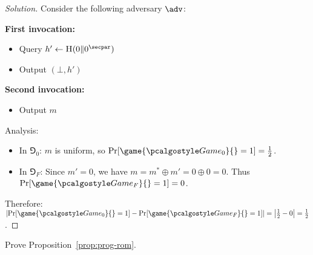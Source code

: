 \begin{proof}[Solution]
  Consider the following adversary $\adv$:
  
  \textbf{First invocation:}
  \begin{itemize}
    \item Query $h' \gets \pcoracle{H}(0 \| 0^\secpar)$
    \item Output $(\bot, h')$
  \end{itemize}
  
  \textbf{Second invocation:}
  \begin{itemize}
    \item Output $m$
  \end{itemize}
  
  Analysis:
  \begin{itemize}
    \item In $\Game_0$: $m$ is uniform, so $\Pr[\game{\Game_0}{} = 1] = \frac{1}{2}$.
    \item In $\Game_F$: Since $m' = 0$, we have $m = m^* \oplus m' = 0 \oplus 0 = 0$. Thus $\Pr[\game{\Game_F}{} = 1] = 0$.
  \end{itemize}
  
  Therefore: $\left|\Pr[\game{\Game_0}{} = 1] - \Pr[\game{\Game_F}{} = 1]\right| = \left|\frac{1}{2} - 0\right| = \frac{1}{2}$.
\end{proof}

\begin{exercise}
  Prove Proposition~\ref{prop:prog-rom}.
\end{exercise}

